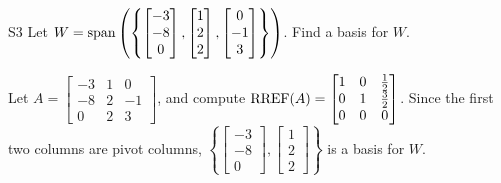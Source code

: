 \documentclass{sbgLAquiz}
\begin{document}
\begin{problem}{S3}
Let $W = {\rm span} \left( \left\{  \begin{bmatrix} -3 \\ -8 \\ 0 \end{bmatrix}, \begin{bmatrix} 1 \\ 2 \\ 2 \end{bmatrix}, \begin{bmatrix} 0 \\ -1 \\ 3 \end{bmatrix} \right\} \right)$.   Find a basis for $W$.
\end{problem}
\begin{solution}
Let $A= \begin{bmatrix}-3 & 1 & 0 \\ -8 & 2 & -1 \\ 0 & 2 & 3\end{bmatrix}$, and compute $\operatorname{RREF}(A) = \begin{bmatrix} 1 & 0 & \frac{1}{2} \\ 0 & 1 & \frac{3}{2} \\ 0 & 0 & 0 \end{bmatrix}$.
Since the first two columns are pivot columns, $\left\{ \begin{bmatrix} -3 \\ -8 \\ 0 \end{bmatrix}, \begin{bmatrix} 1 \\ 2 \\ 2 \end{bmatrix} \right\} $ is a basis for $W$.
\end{solution}
\end{document}
